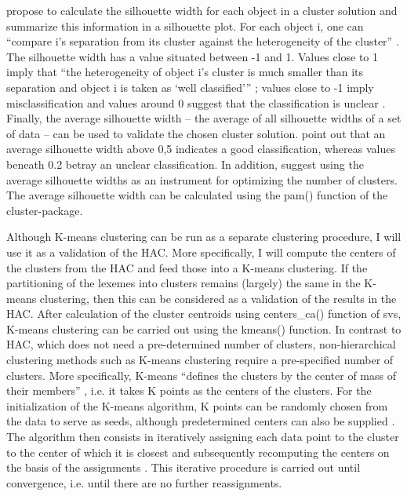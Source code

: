 \citet{kaufman_finding_1990} propose to calculate the silhouette width for each object in a cluster solution and summarize this information in a silhouette plot. For each object i, one can “compare i’s separation from its cluster against the heterogeneity of the cluster” \citep[138]{everitt_cluster_2011}. The silhouette width has a value situated between -1 and 1. Values close to 1 imply that “the heterogeneity of object i’s cluster is much smaller than its separation and object i is taken as ‘well classified’” \citep[128]{everitt_cluster_2011}; values close to -1 imply misclassification and values around 0 suggest that the classification is unclear \citep[128]{everitt_cluster_2011}. Finally, the average silhouette width – the average of all silhouette widths of a set of data – can be used to validate the chosen cluster solution. \citet{kaufman_finding_1990} point out that an average silhouette width above 0,5 indicates a good classification, whereas values beneath 0.2 betray an unclear classification. In addition, \citet[129]{everitt_cluster_2011} suggest using the average silhouette widths as an instrument for optimizing the number of clusters. The average silhouette width can be calculated using the pam() function of the cluster{}-package.

Although K-means clustering can be run as a separate clustering procedure, I will use it as a validation of the HAC. More specifically, I will compute the centers of the clusters from the HAC and feed those into a K-means clustering. If the partitioning of the lexemes into clusters remains (largely) the same in the K-means clustering, then this can be considered as a validation of the results in the HAC. After calculation of the cluster centroids using centers\_ca() function of svs, K-means clustering can be carried out using the kmeans() function. In contrast to HAC, which does not need a pre-determined number of clusters, non-hierarchical clustering methods such as K-means clustering require a pre-specified number of clusters. More specifically, K-means “defines the clusters by the center of mass of their members” \citep[515]{manning_foundations_1999}, i.e. it takes K points as the centers of the clusters. For the initialization of the K-means algorithm, K points can be randomly chosen from the data to serve as seeds, although predetermined centers can also be supplied \citep[515]{manning_foundations_1999}. The algorithm then consists in iteratively assigning each data point to the cluster to the center of which it is closest \citep[515]{manning_foundations_1999} and subsequently recomputing the centers on the basis of the assignments \citep[515--516]{manning_foundations_1999}. This iterative procedure is carried out until convergence, i.e. until there are no further reassignments.

